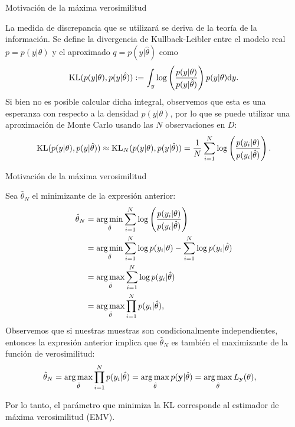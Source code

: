 \documentclass[9pt]{beamer}
\begin{document}
\begin{frame}{Motivación de la máxima verosimilitud}

La medida de discrepancia que se utilizará se deriva de la teoría de la información. Se define la divergencia de Kullback-Leibler entre el modelo real $p =  p(y|\theta)$ y el aproximado $q  = p(y|\hat\theta)$ como
\begin{equation*}
 	\operatorname{\text{KL}}( p(y|\theta),p(y|\hat\theta)) :=  \int_y\log\left(\frac{p(y|\theta)}{p(y|\hat\theta)}\right)p(y|\theta){\text d} y.\label{eq:KL_maxlike}
 \end{equation*} \pause
Si bien no es posible calcular dicha integral, observemos que esta es una esperanza con respecto a la densidad $p(y|\theta)$, por lo que se puede utilizar una aproximación de Monte Carlo usando las $N$ observaciones en $D$:
\begin{equation*}
	\operatorname{\text{KL}}( p(y|\theta),p(y|\hat\theta)) 	\approx \operatorname{\text{KL}}_N( p(y|\theta),p(y|\hat\theta)) = \frac{1}{N}\sum_{i=1}^N\log\left(\frac{p(y_i|\theta)}{p(y_i|\hat\theta)}\right).
\end{equation*}
	
\end{frame}

\begin{frame}{Motivación de la máxima verosimilitud}

Sea $\hat\theta_N$ el minimizante de la  expresión anterior:
 \begin{align*}
 	\hat\theta_N & =  \operatorname*{arg\,min}_{\hat\theta}  \sum_{i=1}^N\log\left(\frac{p(y_i|\theta)}{p(y_i|\hat\theta)}\right)\\
 				&= \operatorname*{arg\,min}_{\hat\theta}  \sum_{i=1}^N  \log p(y_i|\theta) - \sum_{i=1}^N \log p(y_i|\hat\theta)\nonumber\\
 				&= \operatorname*{arg\,max}_{\hat\theta}  \sum_{i=1}^N \log p(y_i|\hat\theta)\nonumber\\
 				&= \operatorname*{arg\,max}_{\hat\theta}  \prod_{i=1}^N p(y_i|\hat\theta),\nonumber
 \end{align*}\pause
Observemos que si nuestras muestras son condicionalmente independientes, entonces la expresión anterior implica que $\hat\theta_N$ es también el maximizante de la función de verosimilitud:
 \begin{align*}
 	\hat\theta_N &= \operatorname*{arg\,max}_{\hat\theta}  \prod_{i=1}^N p(y_i|\hat\theta) = \operatorname*{arg\,max}_{\hat\theta}  p(\mathbf{y}|\hat\theta) = \operatorname*{arg\,max}_{\hat\theta}  L_{\mathbf{y}}(\theta),
 \end{align*}
 
 Por lo tanto, el parámetro que minimiza la KL corresponde al estimador de máxima verosimilitud (EMV).
	
\end{frame}
\end{document}
